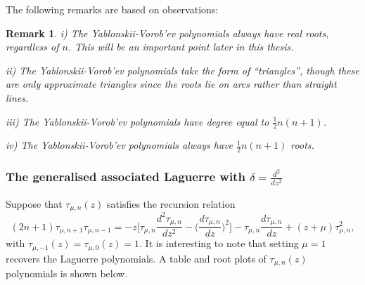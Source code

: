 \documentclass[12pt]{article}
\newtheorem{mydef3}{Remark}[section]
\numberwithin{figure}{section}
\numberwithin{equation}{section}
\numberwithin{table}{section}
\begin{document}
The following remarks are based on observations:
\begin{mydef3}
\item[i)]
The Yablonskii-Vorob'ev polynomials always have real roots, regardless of $n$. This will be an important point later in this thesis.
\item[ii)]
The Yablonskii-Vorob'ev polynomials take the form of ``triangles'', though these are only approximate triangles since the roots lie on arcs rather than straight lines.
\item[iii)]
The Yablonskii-Vorob'ev polynomials have degree equal to $\tfrac{1}{2}n(n+1)$.
\item[iv)]
The Yablonskii-Vorob'ev polynomials always have $\tfrac{1}{2}n(n+1)$ roots.
\end{mydef3}
\subsubsection{The generalised associated Laguerre with $\delta=\frac{d^2}{dz^2}$}
Suppose that $\tau_{\mu,n}(z)$ satisfies the recursion relation
\begin{equation}
(2n+1)\tau_{\mu,n+1}\tau_{\mu,n-1}=-z\bigg[\tau_{\mu,n}\frac{d^2\tau_{\mu,n}}{dz^2}-\bigg(\frac{d\tau_{\mu,n}}{dz}\bigg)^2\bigg]-\tau_{\mu,n}
\frac{d\tau_{\mu,n}}{dz}+(z+\mu)\tau_{\mu,n}^2,\label{P3DDR}
\end{equation}
with $\tau_{\mu,-1}(z)=\tau_{\mu,0}(z)=1$. It is interesting to note that setting $\mu=1$ recovers the Laguerre polynomials.
A table and root plots of $\tau_{\mu,n}(z)$ polynomials is shown below.
\end{document}
